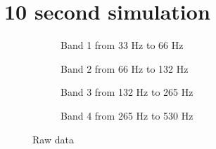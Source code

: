 \section{10 second simulation}
\begin{figure}[H]
\centering
\begin{subfigure}[t]{0.49\textwidth}
    \centering
    
    \caption{Band 1 from 33 Hz to 66 Hz}
    \label{fig:Band1Simulation}
\end{subfigure}
\begin{subfigure}[t]{0.49\textwidth}
    \centering
    
    \caption{Band 2 from 66 Hz to 132 Hz}
    \label{fig:Band2Simulation}
\end{subfigure}
\begin{subfigure}[t]{0.49\textwidth}
    \centering
    
    \caption{Band 3 from 132 Hz to 265 Hz}
    \label{fig:Band3Simulation}
\end{subfigure}
\begin{subfigure}[t]{0.49\textwidth}
    \centering
    
    \caption{Band 4 from 265 Hz to 530 Hz}
    \label{fig:Band4Simulation}
\end{subfigure}
\caption{Raw data}
\label{fig:SimulationComparisson}
\end{figure} 
